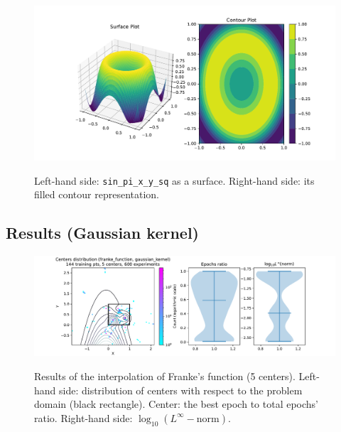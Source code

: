 \documentclass[12pt]{report} %
\begin{document}

\begin{figure}[ht]
  {\includegraphics[width=\textwidth, trim={3cm 0 1cm 0}, clip=true]{imagenes/experiments/2d/sin_pi_x_y_sq_interpolation/Sin_pi_x_y_sq_Contour.pdf}}
  \caption{Left-hand side: \texttt{sin\_pi\_x\_y\_sq} as a surface. Right-hand side:
    its filled contour representation.}
  \label{fig:sin-pi-x-y-sq-function-surface-contour}
\end{figure}


\subsection*{Results (Gaussian kernel)}

\begin{figure}[H]
  {\includegraphics[width=\textwidth, trim={2cm 0 2.8cm 0}, clip=true]{imagenes/experiments/2d/franke_interpolation/tr12_c5_franke_function_gaussian_kernel.pdf}}
  \caption{Results of the interpolation of Franke's function (5 centers).
    Left-hand side: distribution of centers with respect to the problem domain (black rectangle). Center: the best epoch to total epochs' ratio.
    Right-hand side: $\log_{10}(L^\infty-\text{norm})$.}
  \label{fig:franke-tr12-c5}
\end{figure}
\end{document}
